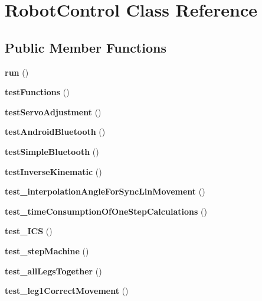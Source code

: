 \hypertarget{class_robot_control}{}\section{Robot\+Control Class Reference}
\label{class_robot_control}
\subsection*{Public Member Functions}
\begin{DoxyCompactItemize}
\item 
\mbox{\label{class_robot_control_af8dcc887d6a52fe6b94523c8b9ecf746}} 
{\bfseries run} ()
\item 
\mbox{\label{class_robot_control_a530d619e20fa880ba539d270b508487e}} 
{\bfseries test\+Functions} ()
\item 
\mbox{\label{class_robot_control_aa8cc8dacbf9f4e6b232668105ab15a19}} 
{\bfseries test\+Servo\+Adjustment} ()
\item 
\mbox{\label{class_robot_control_a4adabcdcfaccaa079c4a540c53e4daaa}} 
{\bfseries test\+Android\+Bluetooth} ()
\item 
\mbox{\label{class_robot_control_ad1ce8b08753ec13739406daf49d2135d}} 
{\bfseries test\+Simple\+Bluetooth} ()
\item 
\mbox{\label{class_robot_control_a66b5d4c35af5be7384bb45534007964e}} 
{\bfseries test\+Inverse\+Kinematic} ()
\item 
\mbox{\label{class_robot_control_a91851748b94bdc8680b146f9402bfde5}} 
{\bfseries test\+\_\+interpolation\+Angle\+For\+Sync\+Lin\+Movement} ()
\item 
\mbox{\label{class_robot_control_a0673868579c41fa105ab1e763521ba29}} 
{\bfseries test\+\_\+time\+Consumption\+Of\+One\+Step\+Calculations} ()
\item 
\mbox{\label{class_robot_control_a2e2f908b8001a0dcc5702b16ccd8ef26}} 
{\bfseries test\+\_\+\+I\+CS} ()
\item 
\mbox{\label{class_robot_control_acbeb418614406725e69cb441e7882b31}} 
{\bfseries test\+\_\+step\+Machine} ()
\item 
\mbox{\label{class_robot_control_a392598a8c4957b06394822f084ea098c}} 
{\bfseries test\+\_\+all\+Legs\+Together} ()
\item 
\mbox{\label{class_robot_control_a5bcaef8d9e58c70f582a2e9b2b42d807}} 
{\bfseries test\+\_\+leg1\+Correct\+Movement} ()
\end{DoxyCompactItemize}
